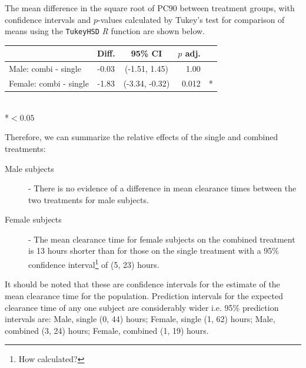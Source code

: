 The mean difference in the square root of PC90 between treatment groups, with confidence intervals and $p$-values calculated by Tukey's test for comparison of means \cite{montgomery} using the \texttt{TukeyHSD} \emph{R} function are shown below.
\begin{table}[h]
\centering
\begin{tabular}{l|ccrl}
&Diff.&95\% CI&$p$ adj.&\\
\hline
Male: combi - single 	& -0.03 & (-1.51, 1.45) & 1.00 &\\
Female: combi - single	& -1.83 & (-3.34,  -0.32) & 0.012 &*\\
\end{tabular}\\
*$<0.05$
\end{table}

Therefore, we can summarize the relative effects of the single and combined treatments:
\begin{description}
\item[Male subjects] - There is no evidence of a difference in mean clearance times between the two treatments for male subjects.
\item[Female subjects] - The mean clearance time for female subjects on the combined treatment is 13 hours shorter than for those on the single treatment with a 95\% confidence interval\footnote{How calculated?} of (5, 23) hours.
\end{description}
It should be noted that these are confidence intervals for the estimate of the mean clearance time for the population. Prediction intervals for the expected clearance time of any one subject are considerably wider i.e. 95\% prediction intervals are: Male, single (0, 44) hours; Female, single (1, 62) hours; Male, combined (3, 24) hours; Female, combined (1, 19) hours.

